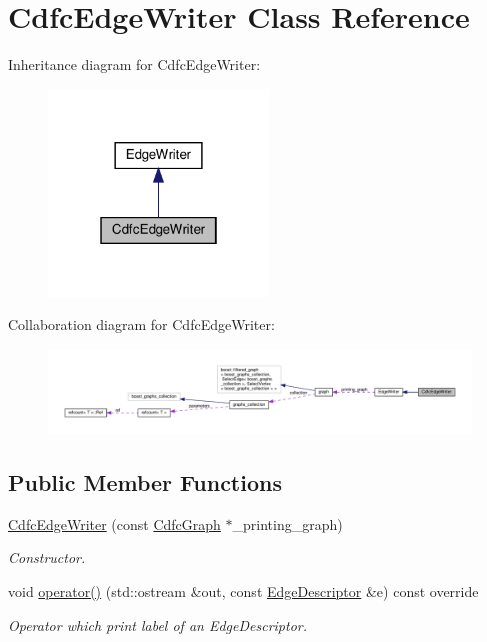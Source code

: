 \hypertarget{classCdfcEdgeWriter}{}\section{Cdfc\+Edge\+Writer Class Reference}
\label{classCdfcEdgeWriter}


Inheritance diagram for Cdfc\+Edge\+Writer\+:
\nopagebreak
\begin{figure}[H]
\begin{center}
\leavevmode
\includegraphics[width=166pt]{d7/d7f/classCdfcEdgeWriter__inherit__graph}
\end{center}
\end{figure}


Collaboration diagram for Cdfc\+Edge\+Writer\+:
\nopagebreak
\begin{figure}[H]
\begin{center}
\leavevmode
\includegraphics[width=350pt]{d5/d51/classCdfcEdgeWriter__coll__graph}
\end{center}
\end{figure}
\subsection*{Public Member Functions}
\begin{DoxyCompactItemize}
\item 
\hyperlink{classCdfcEdgeWriter_a5001706227d2cbec6aa223a4fc31dc5c}{Cdfc\+Edge\+Writer} (const \hyperlink{classCdfcGraph}{Cdfc\+Graph} $\ast$\+\_\+printing\+\_\+graph)
\begin{DoxyCompactList}\small\item\em Constructor. \end{DoxyCompactList}\item 
void \hyperlink{classCdfcEdgeWriter_ad2a0011f644764bd10dc0f77da897a52}{operator()} (std\+::ostream \&out, const \hyperlink{graph_8hpp_a9eb9afea34e09f484b21f2efd263dd48}{Edge\+Descriptor} \&e) const override
\begin{DoxyCompactList}\small\item\em Operator which print label of an Edge\+Descriptor. \end{DoxyCompactList}\end{DoxyCompactItemize}
